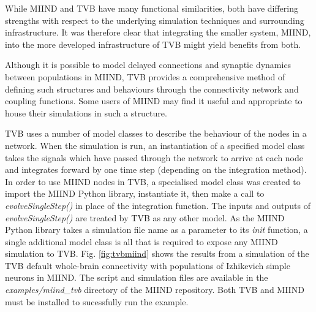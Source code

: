 \documentclass[utf8]{frontiersSCNS} %
\begin{document}
While MIIND and TVB have many functional similarities, both have differing strengths with respect to the underlying simulation techniques and surrounding infrastructure. It was therefore clear that integrating the smaller system, MIIND, into the more developed infrastructure of TVB might yield benefits from both.

Although it is possible to model delayed connections and synaptic dynamics between populations in MIIND, TVB provides a comprehensive method of defining such structures and behaviours through the connectivity network and coupling functions. Some users of MIIND may find it useful and appropriate to house their simulations in such a structure.

TVB uses a number of model classes to describe the behaviour of the nodes in a network. When the simulation is run, an instantiation of a specified model class takes the signals which have passed through the network to arrive at each node and integrates forward by one time step (depending on the integration method). In order to use MIIND nodes in TVB, a specialised model class was created to import the MIIND Python library, instantiate it, then make a call to \textit{evolveSingleStep()} in place of the integration function. The inputs and outputs of \textit{evolveSingleStep()} are treated by TVB as any other model. As the MIIND Python library takes a simulation file name as a parameter to its \textit{init} function, a single additional model class is all that is required to expose any MIIND simulation to TVB. Fig. \ref{fig:tvbmiind} shows the results from a simulation of the TVB default whole-brain connectivity with populations of Izhikevich simple neurons in MIIND. The script and simulation files are available in the \textit{examples/miind\_tvb} directory of the MIIND repository. Both TVB and MIIND must be installed to sucessfully run the example. 
\end{document}
